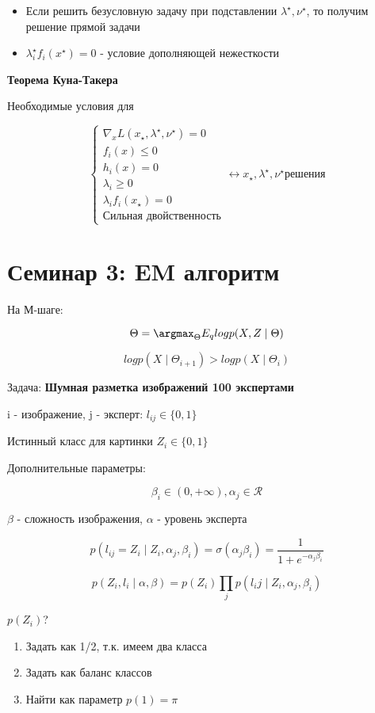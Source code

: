 \documentclass[a4paper, 12pt]{article}
\begin{document}
\begin{itemize}
    \item Если решить безусловную задачу при подставлении $\lambda^{\star}, \nu^{\star}$,
    то получим решение прямой задачи
    \item \(\lambda_i^{\star}f_{i}(x^{\star}) = 0\) - условие дополняющей нежесткости
\end{itemize}

\textbf{Теорема Куна-Такера}

Необходимые условия для 

\[
\begin{cases}
    \nabla_x L(x_{\star}, \lambda^{\star}, \nu^{\star}) = 0 \\
    f_i(x) \leq 0 \\
    h_i(x) = 0 \\
    \lambda_i \geq 0 \\
    \lambda_i f_i(x_{\star}) = 0 \\
    \textrm{Сильная двойственность}
\end{cases}
\leftrightarrow x_{\star}, \lambda^{\star}, \nu^{\star} \textrm{решения}
\]

\section{Семинар 3: EM алгоритм}

На М-шаге:

\[\Theta = \argmax_{\Theta} E_{q} log p(X, Z \mid \Theta)\]

\[log p(X \mid \Theta_{i + 1}) > log p(X \mid \Theta_{i})\]


Задача: \textbf{Шумная разметка изображений 100 экспертами}

i - изображение, j - эксперт: $l_{ij} \in \{0, 1\}$

Истинный класс для картинки $Z_i \in \{0, 1\}$

Дополнительные параметры:

\[\beta_i \in (0, +\infty), \alpha_j \in \mathcal{R}\]

$\beta$ - сложность изображения, $\alpha$ - уровень эксперта

\[p(l_{ij} = Z_i \mid Z_i, \alpha_j, \beta_i) = \sigma(\alpha_j \beta_i) 
= \frac{1}{1 + e^{-\alpha_j \beta_i}}\]

\[p(Z_i, l_i \mid \alpha, \beta) = 
p(Z_i) \prod_{j} p(l_ij \mid Z_i, \alpha_j, \beta_i)\]

\(p(Z_i)\)?

\begin{enumerate}
    \item Задать как 1/2, т.к. имеем два класса
    \item Задать как баланс классов
    \item Найти как параметр \(p(1) = \pi\)
\end{enumerate}
\end{document}
